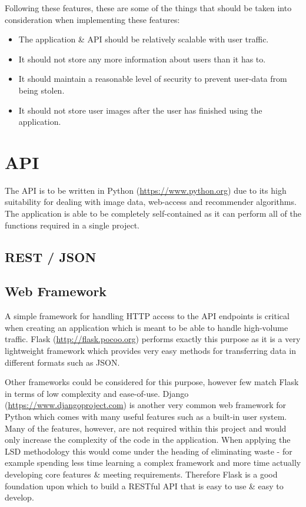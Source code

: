 \documentclass[a4paper,12pt]{report}
\begin{document}
    Following these features, these are some of the things that should be taken into consideration when implementing these features:

      \begin{itemize}
        \item The application \& API should be relatively scalable with user traffic.
        \item It should not store any more information about users than it has to.
        \item It should maintain a reasonable level of security to prevent user-data from being stolen.
        \item It should not store user images after the user has finished using the application.
      \end{itemize}

    \section{API}
      The API is to be written in Python (\url{https://www.python.org}) due to its high suitability for dealing with image data, web-access and recommender algorithms. The application is able to be completely self-contained as it can perform all of the functions required in a single project.

      \subsection{REST / JSON}

      \subsection{Web Framework}
        A simple framework for handling HTTP access to the API endpoints is critical when creating an application which is meant to be able to handle high-volume traffic. Flask (\url{http://flask.pocoo.org}) performs exactly this purpose as it is a very lightweight framework which provides very easy methods for transferring data in different formats such as JSON.

        Other frameworks could be considered for this purpose, however few match Flask in terms of low complexity and ease-of-use. Django (\url{https://www.djangoproject.com}) is another very common web framework for Python which comes with many useful features such as a built-in user system. Many of the features, however, are not required within this project and would only increase the complexity of the code in the application. When applying the LSD methodology  \citep{poppendieck2003lean} this would come under the heading of eliminating waste - for example spending less time learning a complex framework and more time actually developing core features \& meeting requirements. Therefore Flask is a good foundation upon which to build a RESTful API that is easy to use \& easy to develop.
\end{document}
